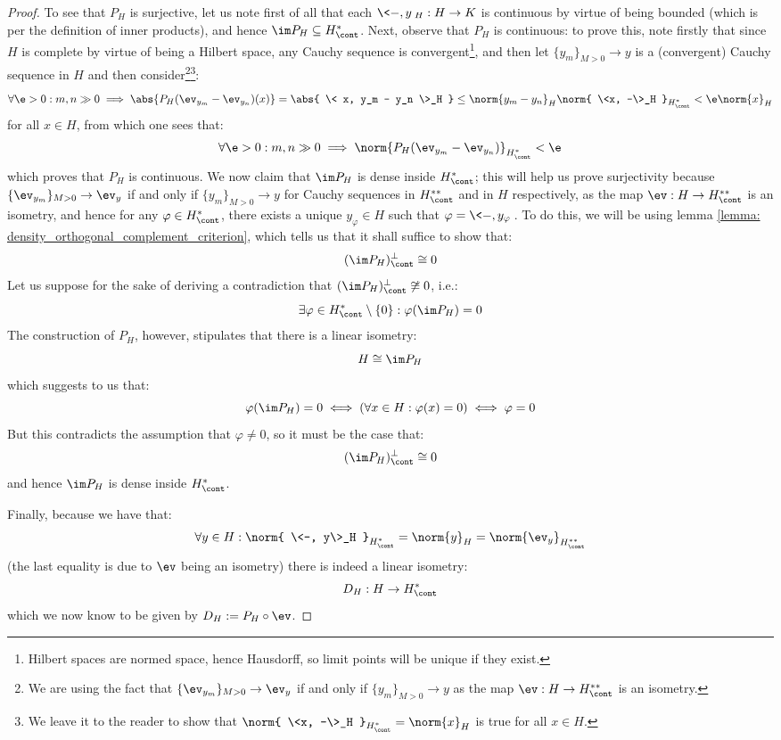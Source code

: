 \begin{proof}
                To see that $P_H$ is surjective, let us note first of all that each $\<-, y\>_H: H \to K$ is continuous by virtue of being bounded (which is per the definition of inner products), and hence $\im P_H \subseteq H^*_{\cont}$. Next, observe that $P_H$ is continuous: to prove this, note firstly that since $H$ is complete by virtue of being a Hilbert space, any Cauchy sequence is convergent\footnote{Hilbert spaces are normed space, hence Hausdorff, so limit points will be unique if they exist.}, and then let $\{y_m\}_{M > 0} \to y$ is a (convergent) Cauchy sequence in $H$ and then consider\footnote{We are using the fact that $\{\ev_{y_m}\}_{M > 0} \to \ev_y$ if and only if $\{y_m\}_{M > 0} \to y$ as the map $\ev: H \to H^{**}_{\cont}$ is an isometry.}\footnote{We leave it to the reader to show that $\norm{ \<x, -\>_H }_{H^*_{\cont}} = \norm{x}_H$ is true for all $x \in H$.}:
                    $$\forall \e > 0: m, n \gg 0 \implies \abs{P_H(\ev_{y_m} - \ev_{y_n})(x)} = \abs{ \< x, y_m - y_n \>_H } \leq \norm{y_m - y_n}_H \norm{ \<x, -\>_H }_{H^*_{\cont}} < \e \norm{x}_H$$
                for all $x \in H$, from which one sees that:
                    $$\forall \e > 0: m, n \gg 0 \implies \norm{ P_H(\ev_{y_m} - \ev_{y_n}) }_{H^*_{\cont}} < \e$$
                which proves that $P_H$ is continuous. We now claim that $\im P_H$ is dense inside $H^*_{\cont}$; this will help us prove surjectivity because $\{\ev_{y_m}\}_{M > 0} \to \ev_y$ if and only if $\{y_m\}_{M > 0} \to y$ for Cauchy sequences in $H^{**}_{\cont}$ and in $H$ respectively, as the map $\ev: H \to H^{**}_{\cont}$ is an isometry, and hence for any $\varphi \in H^*_{\cont}$, there exists a unique $y_{\varphi} \in H$ such that $\varphi = \<-, y_{\varphi}\>$. To do this, we will be using lemma \ref{lemma: density_orthogonal_complement_criterion}, which tells us that it shall suffice to show that:
                    $$(\im P_H)^{\perp}_{\cont} \cong 0$$
                Let us suppose for the sake of deriving a contradiction that $(\im P_H)^{\perp}_{\cont} \not \cong 0$, i.e.:
                    $$\exists \varphi \in H^*_{\cont} \setminus \{0\}: \varphi(\im P_H) = 0$$
                The construction of $P_H$, however, stipulates that there is a linear isometry:
                    $$H \cong \im P_H$$
                which suggests to us that:
                    $$\varphi(\im P_H) = 0 \iff (\forall x \in H: \varphi(x) = 0) \iff \varphi = 0$$
                But this contradicts the assumption that $\varphi \not = 0$, so it must be the case that:
                    $$(\im P_H)^{\perp}_{\cont} \cong 0$$
                and hence $\im P_H$ is dense inside $H^*_{\cont}$.

                Finally, because we have that:
                    $$\forall y \in H: \norm{ \<-, y\>_H }_{H^*_{\cont}} = \norm{y}_H = \norm{\ev_y}_{H^{**}_{\cont}}$$
                (the last equality is due to $\ev$ being an isometry) there is indeed a linear isometry:
                    $$D_H: H \to H^*_{\cont}$$
                which we now know to be given by $D_H := P_H \circ \ev$. 
            \end{proof}
